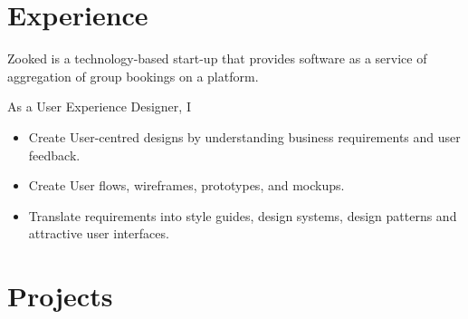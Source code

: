 \documentclass[]{plushcv}
\begin{document}
%
%


%
%

\begin{minipage}[t]{0.70\textwidth} 



\section{Experience}
\vspace{\topsep} %
\begin{tightemize}
\sectionsep
\item Zooked is a technology-based start-up that provides software as a service of aggregation of group bookings on a platform.
\item As a User Experience Designer, I
\begin{itemize}
\item Create User-centred designs by understanding business requirements and user feedback.
\item Create User flows, wireframes, prototypes, and mockups.
\item Translate requirements into style guides, design systems, design patterns and attractive user interfaces.
\end{itemize}
\end{tightemize}
\sectionsep



\section{Projects}


\end{minipage}
\end{document}
